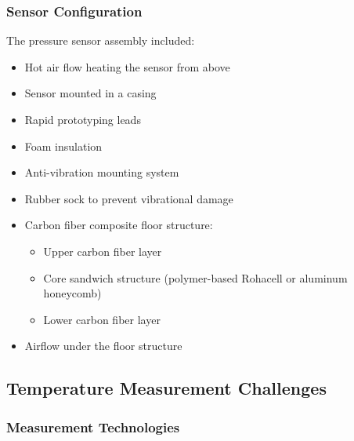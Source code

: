 \subsubsection*{Sensor Configuration}

The pressure sensor assembly included:
\begin{itemize}
    \item Hot air flow heating the sensor from above
    \item Sensor mounted in a casing
    \item Rapid prototyping leads
    \item Foam insulation
    \item Anti-vibration mounting system
    \item Rubber sock to prevent vibrational damage
    \item Carbon fiber composite floor structure:
    \begin{itemize}
        \item Upper carbon fiber layer
        \item Core sandwich structure (polymer-based Rohacell or aluminum honeycomb)
        \item Lower carbon fiber layer
    \end{itemize}
    \item Airflow under the floor structure
\end{itemize}

\subsection*{Temperature Measurement Challenges}

\subsubsection*{Measurement Technologies}

